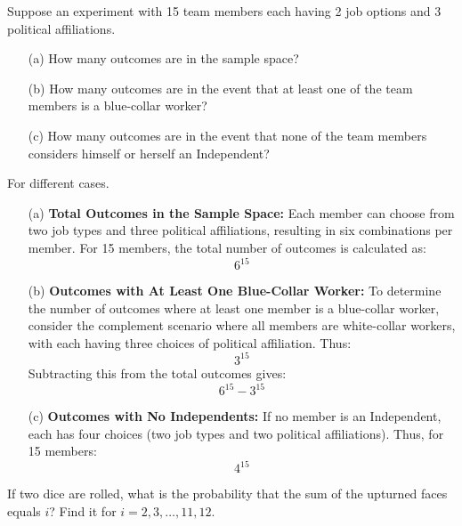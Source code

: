         \begin{exercise}
            Suppose an experiment with 15 team members each having 2 job options and 3 political affiliations.
            \begin{itemize}
                \item[(a)] How many outcomes are in the sample space?
                \item[(b)] How many outcomes are in the event that at least one of the team members is a blue-collar worker?
                \item[(c)] How many outcomes are in the event that none of the team members considers himself or herself an Independent?
            \end{itemize}
        \end{exercise}

        \begin{solution}
            For different cases.
            \begin{enumerate}
                \item[(a)] \textbf{Total Outcomes in the Sample Space:} 
                Each member can choose from two job types and three political affiliations, resulting in six combinations per member. For 15 members, the total number of outcomes is calculated as:
                \[
                6^{15}
                \]
            
                \item[(b)] \textbf{Outcomes with At Least One Blue-Collar Worker:} 
                To determine the number of outcomes where at least one member is a blue-collar worker, consider the complement scenario where all members are white-collar workers, with each having three choices of political affiliation. Thus:
                \[
                3^{15}
                \]
                Subtracting this from the total outcomes gives:
                \[
                6^{15} - 3^{15}
                \]
            
                \item[(c)] \textbf{Outcomes with No Independents:}
                If no member is an Independent, each has four choices (two job types and two political affiliations). Thus, for 15 members:
                \[
                4^{15}
                \]
            \end{enumerate}
        \end{solution}

        \begin{exercise}
            If two dice are rolled, what is the probability that the sum of the upturned faces equals \(i\)? Find it for \(i = 2, 3, \ldots, 11, 12\).
            \end{exercise}
            
